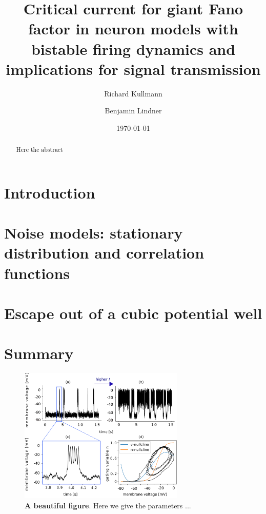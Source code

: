 \documentclass[twocolumn,showpacs,aps,superscriptaddress]{revtex4-1}
\begin{document}
\title{Critical current for giant Fano factor  in neuron models with bistable firing dynamics and implications for signal transmission}

\author{Richard Kullmann}

\author{Benjamin Lindner}
\date{\today}

\begin{abstract}
Here the abstract
\end{abstract}	

\maketitle

\section{Introduction}

\section{Noise models: stationary distribution and correlation functions}

\section{Escape out of a cubic potential well}

\section{Summary}
\onecolumngrid

\begin{figure}[h] 
	\centering
	\includegraphics[width=0.7\textwidth]{FIGURES/vtmerge.pdf}
	\caption{{\bf A beautiful figure}. Here we give the parameters ...
	}
	\label{bistability}
\end{figure}    
\twocolumngrid
\end{document}
